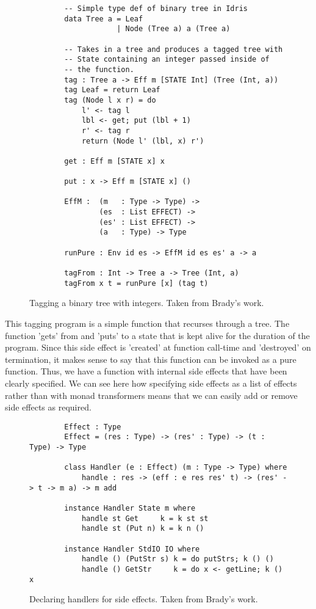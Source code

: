 \begin{figure}[ht!!!!]
    \caption{Tagging a binary tree with integers. Taken from Brady's work.
    \protect\cite{algebraic}}
    \label{tag_def}
    \begin{lstlisting}
        -- Simple type def of binary tree in Idris
        data Tree a = Leaf
                    | Node (Tree a) a (Tree a)
        
        -- Takes in a tree and produces a tagged tree with
        -- State containing an integer passed inside of
        -- the function. 
        tag : Tree a -> Eff m [STATE Int] (Tree (Int, a))
        tag Leaf = return Leaf
        tag (Node l x r) = do
            l' <- tag l
            lbl <- get; put (lbl + 1)
            r' <- tag r
            return (Node l' (lbl, x) r')
        
        get : Eff m [STATE x] x
        
        put : x -> Eff m [STATE x] ()
        
        EffM :  (m   : Type -> Type) ->
                (es  : List EFFECT) ->
                (es' : List EFFECT) ->
                (a   : Type) -> Type
        
        runPure : Env id es -> EffM id es es' a -> a
        
        tagFrom : Int -> Tree a -> Tree (Int, a)
        tagFrom x t = runPure [x] (tag t)
    \end{lstlisting}
\end{figure}

This tagging program is a simple function that recurses through a tree. The
function 'gets' from and 'puts' to a state that is kept alive for the duration
of the program. Since this side effect is 'created' at function call-time and
'destroyed' on termination, it makes sense to say that this function can be
invoked as a pure function. Thus, we have a function with internal side effects
that have been clearly specified. We can see here how specifying side effects as
a list of effects rather than with monad transformers means that we can easily
add or remove side effects as required. 

\begin{figure}[ht!!!!]
    \caption{Declaring handlers for side effects. Taken from Brady's work.
    \protect\cite{algebraic}}
    \label{handlers}
    \begin{lstlisting}
        Effect : Type
        Effect = (res : Type) -> (res' : Type) -> (t : Type) -> Type

        class Handler (e : Effect) (m : Type -> Type) where
            handle : res -> (eff : e res res' t) -> (res' -> t -> m a) -> m add
        
        instance Handler State m where
            handle st Get     k = k st st
            handle st (Put n) k = k n ()
        
        instance Handler StdIO IO where
            handle () (PutStr s) k = do putStrs; k () ()
            handle () GetStr     k = do x <- getLine; k () x
    \end{lstlisting}
\end{figure}


